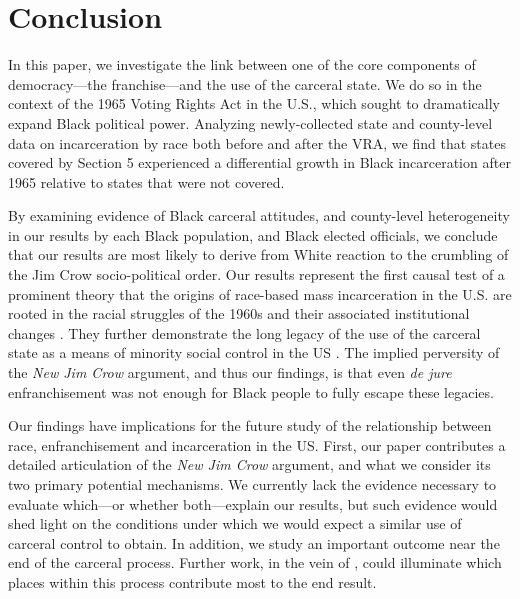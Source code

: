 \documentclass[12pt]{article}
\begin{document}
\section*{Conclusion}

In this paper, we investigate the link between one of the core components of democracy---the franchise---and the use of the carceral state.  We do so in the context of the 1965 Voting Rights Act in the U.S., which sought to dramatically expand Black political power.  Analyzing newly-collected state and county-level data on incarceration by race both before and after the VRA, we find that states covered by Section 5 experienced a differential growth in Black incarceration after 1965 relative to states that were not covered.

By examining evidence of Black carceral attitudes, and county-level heterogeneity in our results by each Black population, and Black elected officials, we conclude that our results are most likely to derive from White reaction to the crumbling of the Jim Crow socio-political order. Our results represent the first causal test of a prominent theory that the origins of race-based mass incarceration in the U.S. are rooted in the racial struggles of the 1960s and their associated institutional changes \citep{Alexander:2012tj}. They further demonstrate the long legacy of the use of the carceral state as a means of minority social control in the US \citep{Oshinsky:1997up,Blackmon:2009wo,Muhammad:2011wf,Mazumder:2019tp}.  The implied perversity of the \emph{New Jim Crow} argument, and thus our findings, is that even \emph{de jure} enfranchisement was not enough for Black people to fully escape these legacies.

Our findings have implications for the future study of the relationship between race, enfranchisement and incarceration in the US.  First, our paper contributes a detailed articulation of the \emph{New Jim Crow} argument, and what we consider its two primary potential mechanisms.  We currently lack the evidence necessary to evaluate which---or whether both---explain our results, but such evidence would shed light on the conditions under which we would expect a similar use of carceral control to obtain.  In addition, we study an important outcome near the end of the carceral process.  Further work, in the vein of \cite{Facchini:2020tb}, could illuminate which places within this process contribute most to the end result.
\end{document}
